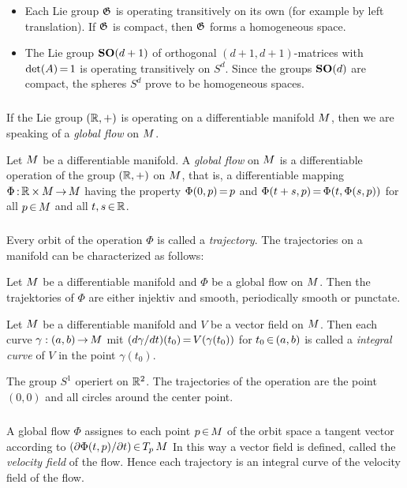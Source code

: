 \documentclass[11pt,twoside]{article}
\begin{document}
\begin{itemize}[leftmargin=15pt]
\item[1.]
Each Lie group $\mathfrak{G}$ is operating transitively on its own
(for example by left translation).
If $\mathfrak{G}$ is compact, then $\mathfrak{G}$ forms a homogeneous space.

\item[2.]
The Lie group $\mathbf{SO}(d+1)$ of orthogonal $(d+1,d+1)$-matrices with
$\det(A) {\,=\,} 1$ is operating transitively on $S^d$.
Since the groups $\mathbf{SO}(d)$ are compact,
the spheres $S^d$ prove to be homogeneous spaces.
\end{itemize}

\subparagraph{}
If the Lie group $({\mathbb{R}},+)$ is operating on a differentiable manifold ${M}$,
then we are speaking of a \textit{global flow} on ${M}$.

\begin{definition}
Let ${M}$ be a differentiable manifold.
A \textit{global flow} on ${M}$ is a differentiable operation
of the group $({\mathbb{R}},+)$ on ${M}$,
that is,
a differentiable mapping
$\Phi {\,:\,} {\mathbb{R}} {\,\times\,} {M} {\,\to\,} {M}$ having the property
$\Phi(0,p) {\,=\,} p$ and $\Phi(t+s,p) {\,=\,} \Phi(t,\Phi(s,p))$
for all $p {\,\in\,} {M}$ and all $t,s {\,\in\,} {\mathbb{R}}$.
\end{definition}

\subparagraph{}
Every orbit of the operation $\Phi$ is called a \textit{trajectory}.
The trajectories on a manifold can be characterized as follows:

\begin{theorem}
Let ${M}$ be a differentiable manifold and
$\Phi$ be a global flow on ${M}$.
Then the trajektories of $\Phi$ are either injektiv and smooth,
periodically smooth or punctate.
\end{theorem}

\begin{definition}
Let ${M}$ be a differentiable manifold and $V$ be a vector field on ${M}$.
Then each curve $\gamma:(a,b) {\,\to\,} {M}$ mit
$(d\gamma/dt)(t_0) {\,=\,} V(\gamma(t_0))$ for $t_0 {\,\in\,} (a,b)$
is called a \textit{integral curve} of $V$ in the point $\gamma(t_0)$.
\end{definition}

\begin{example}
The group $S^1$ operiert on ${\mathbb{R}}^2$.
The trajectories of the operation are the point $(0,0)$
and all circles around the center point.
\end{example}

\subparagraph{}
A global flow $\Phi$ assignes to each point $p {\,\in\,} {M}$ of the orbit space
a tangent vector according to
$(\partial \Phi(t,p) / \partial t) {\,\in\,} T_p\,{M}$
In this way a vector field is defined,
called the \textit{velocity field} of the flow.
Hence each trajectory is an integral curve of the velocity field of the flow.
\end{document}
